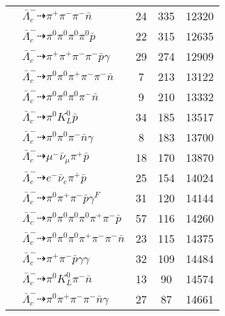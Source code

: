 \documentclass[landscape]{article}
\newcounter{rownumbers}
\newcommand\rn{\stepcounter{rownumbers}\arabic{rownumbers}}
\newcommand{\EOL}{\\} %
\newcommand{\topoTags}[1]{#1} %
\begin{document}
\begin{longtable}{clccc}
\rn & $ \bar{\Lambda}_{c}^{-} \dashrightarrow \pi^{+} \pi^{-} \pi^{-} \bar{n} $ & \topoTags{24 & }335 & 12320 \EOL

\rn & $ \bar{\Lambda}_{c}^{-} \dashrightarrow \pi^{0} \pi^{0} \pi^{0} \pi^{0} \bar{p} $ & \topoTags{22 & }315 & 12635 \EOL

\rn & $ \bar{\Lambda}_{c}^{-} \dashrightarrow \pi^{+} \pi^{+} \pi^{-} \pi^{-} \bar{p} \gamma $ & \topoTags{29 & }274 & 12909 \EOL

\rn & $ \bar{\Lambda}_{c}^{-} \dashrightarrow \pi^{0} \pi^{0} \pi^{+} \pi^{-} \pi^{-} \bar{n} $ & \topoTags{7 & }213 & 13122 \EOL

\rn & $ \bar{\Lambda}_{c}^{-} \dashrightarrow \pi^{0} \pi^{0} \pi^{0} \pi^{-} \bar{n} $ & \topoTags{9 & }210 & 13332 \EOL

\rn & $ \bar{\Lambda}_{c}^{-} \dashrightarrow \pi^{0} K_{L}^{0} \bar{p} $ & \topoTags{34 & }185 & 13517 \EOL

\rn & $ \bar{\Lambda}_{c}^{-} \dashrightarrow \pi^{0} \pi^{0} \pi^{-} \bar{n} \gamma $ & \topoTags{8 & }183 & 13700 \EOL

\rn & $ \bar{\Lambda}_{c}^{-} \dashrightarrow \mu^{-} \bar{\nu}_{\mu} \pi^{+} \bar{p} $ & \topoTags{18 & }170 & 13870 \EOL

\rn & $ \bar{\Lambda}_{c}^{-} \dashrightarrow e^{-} \bar{\nu}_{e} \pi^{+} \bar{p} $ & \topoTags{25 & }154 & 14024 \EOL

\rn & $ \bar{\Lambda}_{c}^{-} \dashrightarrow \pi^{0} \pi^{+} \pi^{-} \bar{p} \gamma^{F} $ & \topoTags{31 & }120 & 14144 \EOL

\rn & $ \bar{\Lambda}_{c}^{-} \dashrightarrow \pi^{0} \pi^{0} \pi^{0} \pi^{0} \pi^{+} \pi^{-} \bar{p} $ & \topoTags{57 & }116 & 14260 \EOL

\rn & $ \bar{\Lambda}_{c}^{-} \dashrightarrow \pi^{0} \pi^{0} \pi^{0} \pi^{+} \pi^{-} \pi^{-} \bar{n} $ & \topoTags{23 & }115 & 14375 \EOL

\rn & $ \bar{\Lambda}_{c}^{-} \dashrightarrow \pi^{+} \pi^{-} \bar{p} \gamma \gamma $ & \topoTags{32 & }109 & 14484 \EOL

\rn & $ \bar{\Lambda}_{c}^{-} \dashrightarrow \pi^{0} K_{L}^{0} \pi^{-} \bar{n} $ & \topoTags{13 & }90 & 14574 \EOL

\rn & $ \bar{\Lambda}_{c}^{-} \dashrightarrow \pi^{0} \pi^{+} \pi^{-} \pi^{-} \bar{n} \gamma $ & \topoTags{27 & }87 & 14661 \EOL


\end{longtable}
\end{document}
